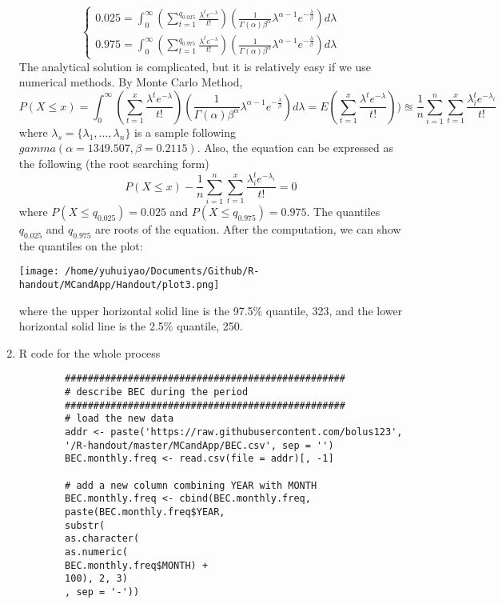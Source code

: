 \begin{enumerate}
\begin{equation*}
\begin{cases}
		0.025 = \int_{0}^{\infty}(\sum_{t = 1}^{q_{0.025}}\frac{\lambda^{t}e^{-\lambda}}{t!})(\frac{1}{\Gamma(\alpha)\beta^{\alpha}}\lambda^{\alpha - 1}e^{-\frac{\lambda}{\beta}}) d \lambda \\
		0.975 = \int_{0}^{\infty}(\sum_{t = 1}^{q_{0.975}}\frac{\lambda^{t}e^{-\lambda}}{t!})(\frac{1}{\Gamma(\alpha)\beta^{\alpha}}\lambda^{\alpha - 1}e^{-\frac{\lambda}{\beta}}) d \lambda
		\end{cases}
	\end{equation*}
	The analytical solution is complicated, but it is relatively easy if we use numerical methods. By Monte Carlo Method,
	\begin{equation*}
		P(X \le x) = \int_{0}^{\infty}(\sum_{t = 1}^{x}\frac{\lambda^{t}e^{-\lambda}}{t!})(\frac{1}{\Gamma(\alpha)\beta^{\alpha}}\lambda^{\alpha - 1}e^{-\frac{\lambda}{\beta}}) d \lambda = E(\sum_{t = 1}^{x}\frac{\lambda^{t}e^{-\lambda}}{t!})) \approxeq \frac{1}{n} \sum_{i = 1}^{n} \sum_{t = 1}^{x}\frac{\lambda_i^{t}e^{-\lambda_i}}{t!}
	\end{equation*}
	where $\lambda_s = \{\lambda_1,...,\lambda_n \}$ is a sample following $gamma(\alpha= 1349.507, \beta = 0.2115)$. Also, the equation can be expressed as the following (the root searching form)
	\begin{equation*}
		P(X \le x) - \frac{1}{n} \sum_{i = 1}^{n} \sum_{t = 1}^{x}\frac{\lambda_i^{t}e^{-\lambda_i}}{t!} = 0
	\end{equation*}
	where $P(X \le q_{0.025}) = 0.025$ and $P(X \le  q_{0.975}) = 0.975$. The quantiles $q_{0.025}$ and $q_{0.975}$ are roots of the equation. After the computation, we can show the quantiles on the plot:
	\begin{center}
		\texttt{[image: /home/yuhuiyao/Documents/Github/R-handout/MCandApp/Handout/plot3.png]}
	\end{center}
	where the upper horizontal solid line is the 97.5\% quantile, 323, and the lower horizontal solid line is the 2.5\% quantile, 250.
	\item R code for the whole process
	\begin{verbatim}
		#################################################
		# describe BEC during the period
		#################################################
		# load the new data
		addr <- paste('https://raw.githubusercontent.com/bolus123', 
		'/R-handout/master/MCandApp/BEC.csv', sep = '')
		BEC.monthly.freq <- read.csv(file = addr)[, -1]
		
		# add a new column combining YEAR with MONTH
		BEC.monthly.freq <- cbind(BEC.monthly.freq, 
		paste(BEC.monthly.freq$YEAR, 
		substr(
		as.character(
		as.numeric(
		BEC.monthly.freq$MONTH) + 
		100), 2, 3)
		, sep = '-'))
		

\end{verbatim}
\end{enumerate}
